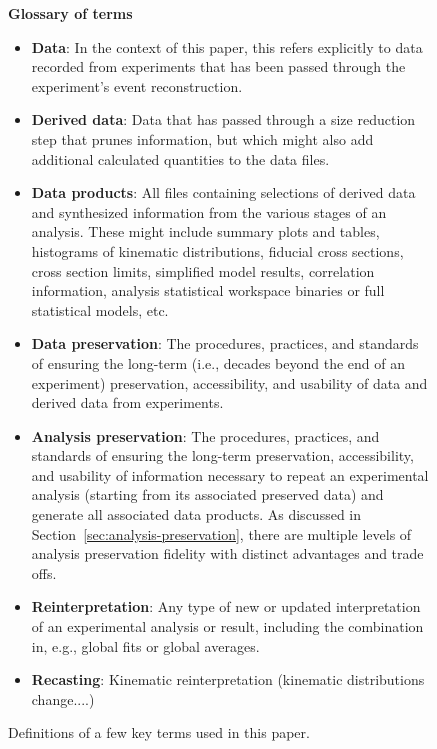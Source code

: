 \documentclass[11pt]{article}
\begin{document}
\begin{figure}[h!]
\begin{tcolorbox}
\begin{center}
{\large \textbf{Glossary of terms}}
\end{center}
%
\begin{itemize}
    \item \textbf{Data}: In the context of this paper, this refers explicitly to data recorded from experiments that has been passed through the experiment's event reconstruction.
    \item \textbf{Derived data}: Data that has passed through a size reduction step that prunes information, but which might also add additional calculated quantities to the data files.
    \item \textbf{Data products}: All files containing selections of derived data and synthesized information from the various stages of an analysis.
These might include summary plots and tables, histograms of kinematic distributions, fiducial cross sections, cross section limits, simplified model results, correlation information, analysis statistical workspace binaries or full statistical models, etc.
    \item \textbf{Data preservation}: The procedures, practices, and standards of ensuring the long-term (i.e., decades beyond the end of an experiment) preservation, accessibility, and usability of data and derived data from experiments.
    \item \textbf{Analysis preservation}: The procedures, practices, and standards of ensuring the long-term preservation, accessibility, and usability of information necessary to repeat an experimental analysis (starting from its associated preserved data) and generate all associated data products.
    As discussed in Section~\ref{sec:analysis-preservation}, there are multiple levels of analysis preservation fidelity with distinct advantages and trade offs.
    \item \textbf{Reinterpretation}: Any type of new or updated interpretation of an experimental analysis or result, including the combination in, e.g., global fits or global averages. 
    \item \textbf{Recasting}: Kinematic reinterpretation (kinematic distributions change....) %
\end{itemize}
\end{tcolorbox}
\caption{Definitions of a few key terms used in this paper.}
\label{fig:glossary}
\end{figure}
\end{document}
